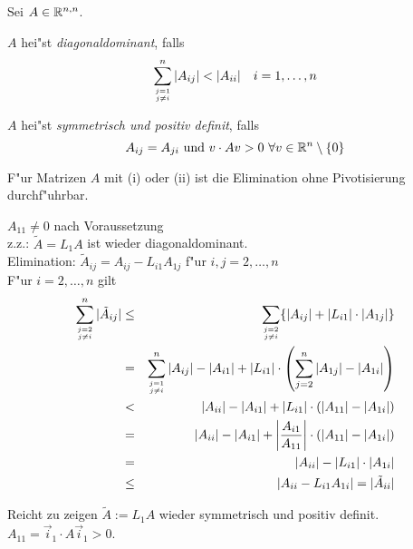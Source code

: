 \documentclass{scrartcl}
\begin{document}
\begin{Satz}
Sei $A \in \mathbb{R}^{n,n}$. 
\begin{iaufz}
\item $A$ hei"st \emph{diagonaldominant}, falls 
$$ \sum\limits_{\genfrac{}{}{0pt}{}{j=1}{j \neq i}}^{n} \vert A_{ij} \vert < \vert A_{ii} \vert \quad i=1, \ldots, n$$
\item $A$ hei"st \emph{symmetrisch und positiv definit}, falls 
$$A_{ij} = A_{ji} \mathrm{\ und \ } v \cdot Av > 0 \ \forall v \in \mathbb{R}^{n} \setminus \{ 0 \} $$
\end{iaufz}
F"ur Matrizen $A$ mit (i) oder (ii) ist die Elimination ohne Pivotisierung durchf"uhrbar.
\end{Satz}
\begin{Bew}
\begin{iaufz}
\item $A_{11} \neq 0$ nach Voraussetzung \\
z.z.: $\tilde A = L_1 A$ ist wieder diagonaldominant. \\
Elimination: $\tilde A_{ij} = A_{ij} - L_{i1} A_{1j}$ f"ur $i,j = 2, \ldots, n$ \\
F"ur $i = 2, \ldots, n$ gilt 
\begin{eqnarray*}
\sum\limits_{\genfrac{}{}{0pt}{}{j=2}{j \neq i}}^n \vert \tilde A_{ij} \vert & \leq & \sum\limits_{\genfrac{}{}{0pt}{}{j=2}{j \neq i}} \{ \vert A_{ij} \vert + \vert L_{i1} \vert \cdot \vert A_{1j} \vert \} \\
& = & \sum\limits_{\genfrac{}{}{0pt}{}{j=1}{j \neq i}}^n \vert A_{ij} \vert - \vert A_{i1} \vert + \vert L_{i1} \vert \cdot \left( \sum\limits_{j=2}^n \vert A_{1j} \vert - \vert A_{1i} \vert \right) \\
& < & \vert A_{ii} \vert - \vert A_{i1} \vert + \vert L_{i1} \vert \cdot ( \vert A_{11} \vert - \vert A_{1i} \vert ) \\
& = &  \vert A_{ii} \vert - \vert A_{i1} \vert + \left\vert \frac{A_{i1}}{A_{11}} \right\vert \cdot ( \vert A_{11} \vert - \vert A_{1i} \vert ) \\
& = & \vert A_{ii} \vert - \vert L_{i1} \vert \cdot \vert A_{1i} \vert \\
& \leq & \vert A_{ii} - L_{i1} A_{1i} \vert = \vert \tilde A_{ii} \vert
\end{eqnarray*}
\item Reicht zu zeigen $\tilde A := L_1 A$ wieder symmetrisch und positiv definit. \\
$A_{11} = \vec i_1 \cdot A \vec i_1 > 0$. \\

\end{iaufz}
\end{Bew}
\end{document}
